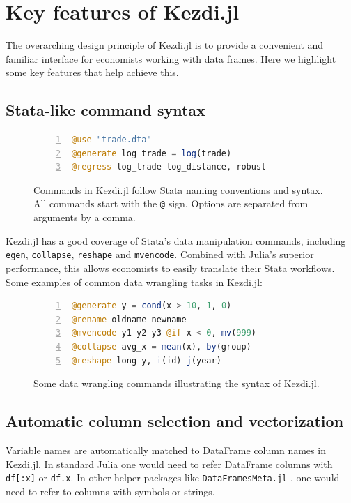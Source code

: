 \documentclass{juliacon}
\begin{document}
\section{Key features of Kezdi.jl}

The overarching design principle of Kezdi.jl is to provide a convenient and familiar interface for economists working with data frames. Here we highlight some key features that help achieve this.

\subsection{Stata-like command syntax}

\begin{figure}[h!]
\begin{lstlisting}[language = Julia, numbers=left, numberstyle=\tiny\color{gray}]
@use "trade.dta"
@generate log_trade = log(trade)
@regress log_trade log_distance, robust
\end{lstlisting}
\caption{Commands in Kezdi.jl follow Stata naming conventions and syntax. All commands start with the \texttt{@} sign. Options are separated from arguments by a comma.}
\label{fig:syntax}
\end{figure}

Kezdi.jl has a good coverage of Stata's data manipulation commands, including \texttt{egen}, \texttt{collapse}, \texttt{reshape} and \texttt{mvencode}. Combined with Julia's superior performance, this allows economists to easily translate their Stata workflows. Some examples of common data wrangling tasks in Kezdi.jl:

\begin{figure}[h!]
\begin{lstlisting}[language = Julia, numbers=left, numberstyle=\tiny\color{gray}]
@generate y = cond(x > 10, 1, 0)
@rename oldname newname
@mvencode y1 y2 y3 @if x < 0, mv(999)
@collapse avg_x = mean(x), by(group)
@reshape long y, i(id) j(year)
\end{lstlisting}
\caption{Some data wrangling commands illustrating the syntax of Kezdi.jl.}
\label{fig:wrangling}
\end{figure}

\subsection{Automatic column selection and vectorization}

Variable names are automatically matched to DataFrame column names in Kezdi.jl. In standard Julia one would need to refer DataFrame columns with \texttt{df[:x]} or \texttt{df.x}. In other helper packages like \texttt{DataFramesMeta.jl} \cite{DataFramesMeta}, one would need to refer to columns with symbols or strings.
\end{document}
